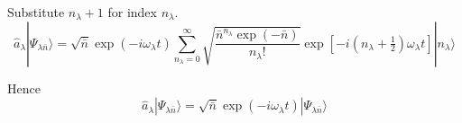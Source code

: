 Substitute $n_\lambda+1$ for index $n_\lambda$.
\begin{equation*}
\hat a_\lambda|\Psi_{\lambda\bar n}\rangle
=\sqrt{\bar n}\exp(-i\omega_\lambda t)
\sum_{n_\lambda=0}^\infty
\sqrt{\frac{\bar n^{n_\lambda}\exp(-\bar n)}{n_\lambda!}}
\exp\left[-i\left(n_\lambda+\tfrac{1}{2}\right)\omega_\lambda t\right]
|n_\lambda\rangle
\end{equation*}

Hence
\begin{equation*}
\hat a_\lambda|\Psi_{\lambda\bar n}\rangle=\sqrt{\bar n}\exp(-i\omega_\lambda t)|\Psi_{\lambda\bar n}\rangle
\end{equation*}


